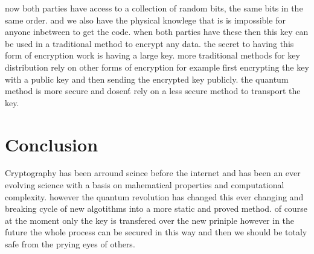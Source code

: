 \documentclass[12pt]{article}
\begin{document}
now both parties have access to a collection of random bits, the same bits
in the same order. and we also have the physical knowlege that is is
impossible for anyone inbetween to get the code. when both parties have
these then this key can be used in a traditional method to encrypt any data.
the secret to having this form of encryption work is having a large key.
more traditional methods for key distribution rely on other forms of encryption
for example first encrypting the key with a public key and then sending 
the encrypted key publicly. the quantum method is more secure and dosen\'t
rely on a less secure method to transport the key.

\section{Conclusion}
Cryptography has been arround scince before the internet and has been
an ever evolving science with a basis on mahematical properties and 
computational complexity. however the quantum revolution has changed this
ever changing and breaking cycle of new algotithms into a more static and
proved method. of course at the moment only the key is transfered over the
new priniple however in the future the whole process can be secured in this
way and then we should be totaly safe from the prying eyes of others.
\end{document}
